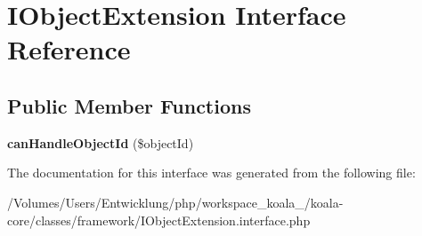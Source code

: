 \hypertarget{interface_i_object_extension}{
\section{IObjectExtension Interface Reference}
\label{interface_i_object_extension}
}
\subsection*{Public Member Functions}
\begin{DoxyCompactItemize}
\item 
\hypertarget{interface_i_object_extension_a986ee71dd69d3d0183e9fe265b7f3dab}{
{\bfseries canHandleObjectId} (\$objectId)}
\label{interface_i_object_extension_a986ee71dd69d3d0183e9fe265b7f3dab}

\end{DoxyCompactItemize}


The documentation for this interface was generated from the following file:\begin{DoxyCompactItemize}
\item 
/Volumes/Users/Entwicklung/php/workspace\_\-koala\_/koala-\/core/classes/framework/IObjectExtension.interface.php\end{DoxyCompactItemize}
